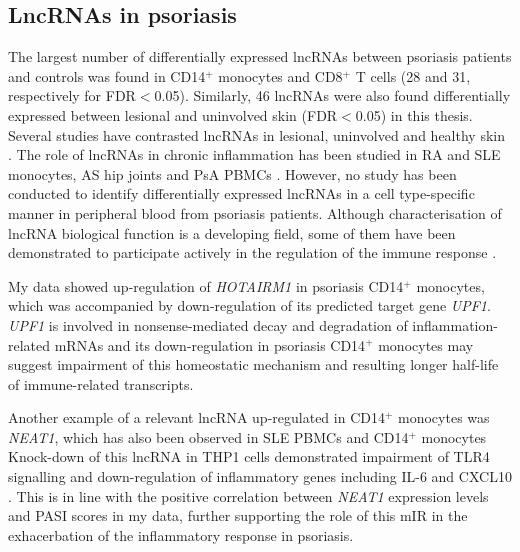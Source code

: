 \subsection{LncRNAs in psoriasis}
The largest number of differentially expressed lncRNAs between psoriasis patients and controls was found in CD14$^+$ monocytes and CD8$^+$ T cells (28 and 31, respectively for FDR$<$0.05). Similarly, 46 lncRNAs were also found differentially expressed between lesional and uninvolved skin (FDR$<$0.05) in this thesis. Several studies have contrasted lncRNAs in lesional, uninvolved and healthy skin \parencite{Li2014,Gupta2016,Ahn2016,Tsoi2015}. The role of lncRNAs in chronic inflammation has been studied in RA and SLE monocytes, AS hip joints and PsA PBMCs \parencite{Muller2014,Shi2014,Zhang2017, Dolcino2018}. However, no study has been conducted to identify differentially expressed lncRNAs in a cell type-specific manner in peripheral blood from psoriasis patients. Although characterisation of lncRNA biological function is a developing field, some of them have been demonstrated to participate actively in the regulation of the immune response \parencite{Heward2014}. 

 My data showed up-regulation of \textit{HOTAIRM1} in psoriasis CD14$^+$ monocytes, which was accompanied by down-regulation of its predicted target gene \textit{UPF1}. \textit{UPF1} is involved in nonsense-mediated decay and degradation of inflammation-related mRNAs \parencite{Mino2015} and its down-regulation in psoriasis CD14$^+$ monocytes may suggest impairment of this homeostatic mechanism and resulting longer half-life of immune-related transcripts. 
 
 Another example of a relevant lncRNA up-regulated in CD14$^+$ monocytes was \textit{NEAT1}, which has also been observed in SLE PBMCs and CD14$^+$ monocytes \parencite{Zhang2016} Knock-down of this lncRNA in THP1 cells demonstrated impairment of TLR4 signalling and down-regulation of inflammatory genes including IL-6 and CXCL10 \parencite{Zhang2016}. This is in line with the positive correlation between \textit{NEAT1} expression levels and PASI scores in my data, further supporting the role of this mIR in the exhacerbation of the inflammatory response in psoriasis. %

